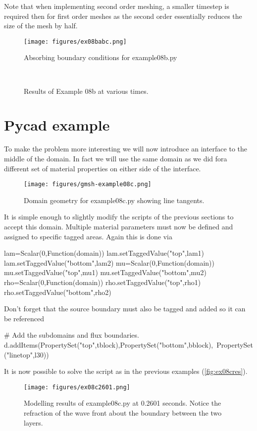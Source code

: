 Note that when implementing second order meshing, a smaller timestep is required
then for first order meshes as the second order essentially reduces the size of
the mesh by half.

\begin{figure}[ht]
 \centering
 \texttt{[image: figures/ex08babc.png]}
 \label{fig:abconds}
 \caption{Absorbing boundary conditions for example08b.py}
\end{figure}

\begin{figure}[htp]
\centering
{}
 \\
\label{fig:ex08pw}
\caption{Results of Example 08b at various times.}
\end{figure}
\clearpage

\section{Pycad example}
To make the problem more interesting we will now introduce an interface to the
middle of the domain. In fact we will use the same domain as we did fora
different set of material properties on either side of the interface.

\begin{figure}[ht]
\begin{center}
\texttt{[image: figures/gmsh-example08c.png]}
\caption{Domain geometry for example08c.py showing line tangents.}
\label{fig:ex08cgeo}
\end{center}
\end{figure}

It is simple enough to slightly modify the scripts of the previous sections to
accept this domain. Multiple material parameters must now be defined and assigned
to specific tagged areas. Again this is done via
\begin{python}
lam=Scalar(0,Function(domain))
lam.setTaggedValue("top",lam1)
lam.setTaggedValue("bottom",lam2)
mu=Scalar(0,Function(domain))
mu.setTaggedValue("top",mu1)
mu.setTaggedValue("bottom",mu2)
rho=Scalar(0,Function(domain))
rho.setTaggedValue("top",rho1)
rho.setTaggedValue("bottom",rho2)
\end{python}
Don't forget that the source boundary must also be tagged and added so it can
be referenced 
\begin{python}
# Add the subdomains and flux boundaries.
d.addItems(PropertySet("top",tblock),PropertySet("bottom",bblock),\
                                     PropertySet("linetop",l30))
\end{python}
It is now possible to solve the script as in the previous examples
(\autoref{fig:ex08cres}).

\begin{figure}[ht]
\centering
\texttt{[image: figures/ex08c2601.png]}
\caption{Modelling results of example08c.py at 0.2601 seconds. Notice the
refraction of the wave front about the boundary between the two layers.}
\label{fig:ex08cres}
\end{figure}


